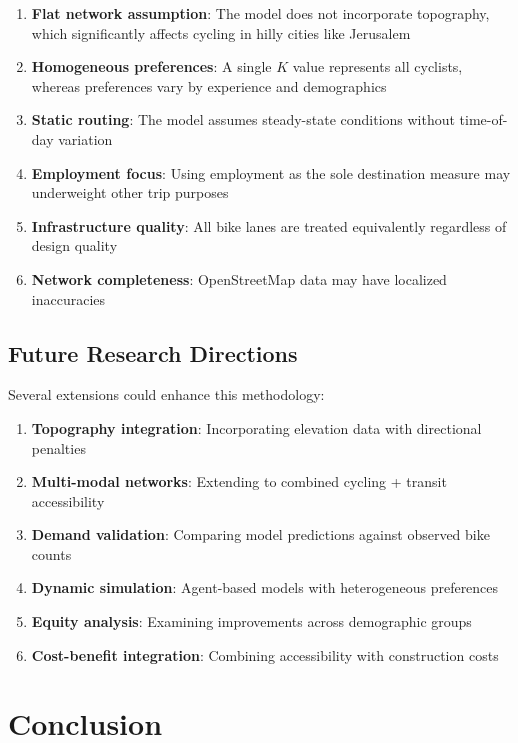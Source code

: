 \documentclass[12pt,a4paper]{article}
\begin{document}
\begin{enumerate}
    \item \textbf{Flat network assumption}: The model does not incorporate topography, which significantly affects cycling in hilly cities like Jerusalem
    \item \textbf{Homogeneous preferences}: A single $K$ value represents all cyclists, whereas preferences vary by experience and demographics
    \item \textbf{Static routing}: The model assumes steady-state conditions without time-of-day variation
    \item \textbf{Employment focus}: Using employment as the sole destination measure may underweight other trip purposes
    \item \textbf{Infrastructure quality}: All bike lanes are treated equivalently regardless of design quality
    \item \textbf{Network completeness}: OpenStreetMap data may have localized inaccuracies
\end{enumerate}

\subsection{Future Research Directions}

Several extensions could enhance this methodology:

\begin{enumerate}
    \item \textbf{Topography integration}: Incorporating elevation data with directional penalties
    \item \textbf{Multi-modal networks}: Extending to combined cycling + transit accessibility
    \item \textbf{Demand validation}: Comparing model predictions against observed bike counts
    \item \textbf{Dynamic simulation}: Agent-based models with heterogeneous preferences
    \item \textbf{Equity analysis}: Examining improvements across demographic groups
    \item \textbf{Cost-benefit integration}: Combining accessibility with construction costs
\end{enumerate}

\section{Conclusion}
\label{sec:conclusion}
\end{document}
